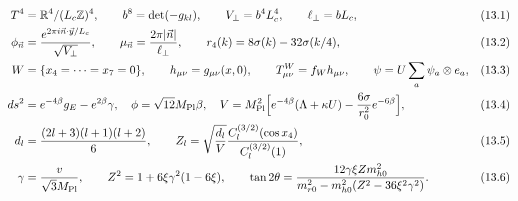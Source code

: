 \documentclass[10pt,a4paper]{article}
\begin{document}
\begin{align*}
T^4&=\mathbb R^4/(L_c\mathbb Z)^4,\qquad b^8=\det(-g_{kl}),\qquad V_\perp=b^4L_c^4,\qquad \ell_\perp=bL_c,&&(13.1) \\
\phi_{\vec n}&=\frac{e^{2\pi i\vec n\cdot\vec y/L_c}}{\sqrt{V_\perp}},\qquad \mu_{\vec n}=\frac{2\pi|\vec n|}{\ell_\perp},\qquad r_4(k)=8\sigma(k)-32\sigma(k/4),&&(13.2) \\
W&=\{x_4=\dots=x_7=0\},\qquad h_{\mu\nu}=g_{\mu\nu}(x,0),\qquad T^W_{\mu\nu}=f_Wh_{\mu\nu},\qquad \psi=U\sum_a\psi_a\otimes e_a,&&(13.3) \\
ds^2&=e^{-4\beta}g_E-e^{2\beta}\gamma,\quad \phi=\sqrt{12}M_{\rm Pl}\beta,\quad V=M_{\rm Pl}^2\Big[e^{-4\beta}(\Lambda+\kappa U)-\frac{6\sigma}{r_0^2}e^{-6\beta}\Big],&&(13.4) \\
d_l&=\frac{(2l+3)(l+1)(l+2)}6,\qquad Z_l=\sqrt{\frac{d_l}V}\frac{C_l^{(3/2)}(\cos x_4)}{C_l^{(3/2)}(1)},&&(13.5) \\
\gamma&=\frac v{\sqrt3M_{\rm Pl}},\qquad Z^2=1+6\xi\gamma^2(1-6\xi),\qquad \tan2\theta=\frac{12\gamma\xi Zm_{h0}^2}{m_{r0}^2-m_{h0}^2(Z^2-36\xi^2\gamma^2)}.&&(13.6)
\end{align*}
\end{document}
